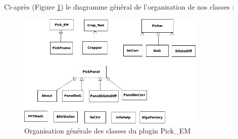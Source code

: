 Ci-après (Figure \ref{classes}) le diagramme général de l'organisation de nos classes :

\begin{figure}[!h] 
\begin{center}
\includegraphics[width=0.8\textwidth]{class_diagram.png}
\caption{Organisation générale des classes du plugin Pick\_EM}
\label{classes}
\end{center}
\end{figure}


%

